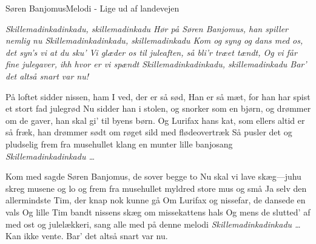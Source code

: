 \begin{sang}{Søren Banjomus}{Melodi - Lige ud af landevejen}

\begin{vers}
{\em Skillemadinkadinkadu, skillemadinkadu
Hør på Søren Banjomus, han spiller nemlig nu
Skillemadinkadinkadu, skillemadinkadu
Kom og syng og dans med os, det syn's vi at du sku'
Vi glæder os til juleaften, så bli'r træet tændt,
Og vi får fine julegaver, ihh hvor er vi spændt
Skillemadinkadinkadu, skillemadinkadu
Bar' det altså snart var nu!}
\end{vers}
\begin{vers}
På loftet sidder nissen, ham I ved, der er så sød,
Han er så mæt, for han har spist et stort fad julegrød
Nu sidder han i stolen, og snorker som en bjørn,
og drømmer om de gaver, han skal gi' til byens børn.
Og Lurifax hans kat, som ellers altid er så fræk,
han drømmer sødt om røget sild med flødeovertræk
Så pusler det og pludselig frem fra musehullet klang
en munter lille banjosang
{\em Skillemadinkadinkadu \ldots}
\end{vers}

\begin{vers}
Kom med sagde Søren Banjomus, de sover begge to
Nu skal vi lave skæg---juhu skreg musene og lo
og frem fra musehullet myldred store mus og små
Ja selv den allermindste Tim, der knap nok kunne gå
Om Lurifax og nissefar, de dansede en vals
Og lille Tim bandt nissens skæg om missekattens hals
Og mens de slutted' af med ost og julelækkeri,
sang alle med på denne melodi
{\em Skillemadinkadinkadu \ldots} 
Kan ikke vente.
Bar' det altså snart var nu.
\end{vers}

\end{sang}